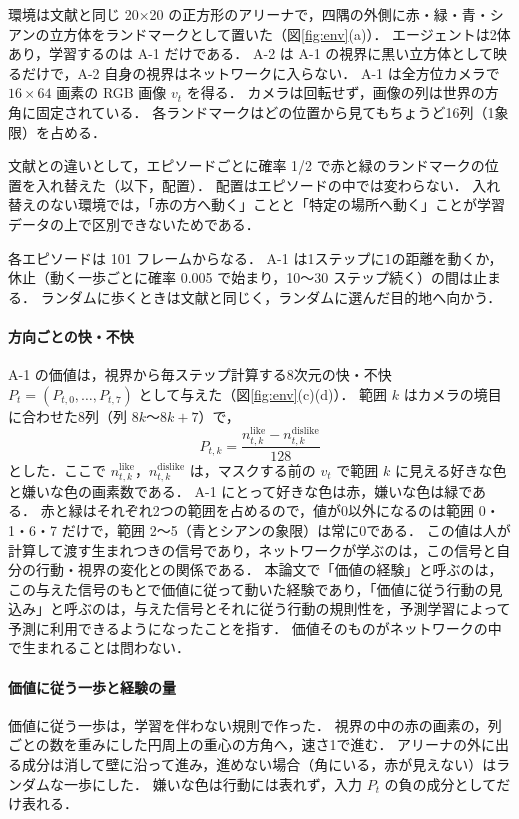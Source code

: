 環境は文献\cite{noguchi2022superposition}と同じ 20×20 の正方形のアリーナで，四隅の外側に赤・緑・青・シアンの立方体をランドマークとして置いた（図\ref{fig:env}(a)）．
エージェントは2体あり，学習するのは A-1 だけである．
A-2 は A-1 の視界に黒い立方体として映るだけで，A-2 自身の視界はネットワークに入らない．
A-1 は全方位カメラで $16\times64$ 画素の RGB 画像 $v_t$ を得る．
カメラは回転せず，画像の列は世界の方角に固定されている．
各ランドマークはどの位置から見てもちょうど16列（1象限）を占める．

文献\cite{noguchi2022superposition}との違いとして，エピソードごとに確率 1/2 で赤と緑のランドマークの位置を入れ替えた（以下，配置）．
配置はエピソードの中では変わらない．
入れ替えのない環境では，「赤の方へ動く」ことと「特定の場所へ動く」ことが学習データの上で区別できないためである．

各エピソードは 101 フレームからなる．
A-1 は1ステップに1の距離を動くか，休止（動く一歩ごとに確率 0.005 で始まり，10〜30 ステップ続く）の間は止まる．
ランダムに歩くときは文献\cite{noguchi2022superposition}と同じく，ランダムに選んだ目的地へ向かう．

\paragraph{方向ごとの快・不快}
A-1 の価値は，視界から毎ステップ計算する8次元の快・不快 $P_t=(P_{t,0},\dots,P_{t,7})$ として与えた（図\ref{fig:env}(c)(d)）．
範囲 $k$ はカメラの境目に合わせた8列（列 $8k$〜$8k{+}7$）で，
\begin{equation}
  P_{t,k} = \frac{n^{\mathrm{like}}_{t,k} - n^{\mathrm{dislike}}_{t,k}}{128}
\end{equation}
とした．ここで $n^{\mathrm{like}}_{t,k}$，$n^{\mathrm{dislike}}_{t,k}$ は，マスクする前の $v_t$ で範囲 $k$ に見える好きな色と嫌いな色の画素数である．
A-1 にとって好きな色は赤，嫌いな色は緑である．
赤と緑はそれぞれ2つの範囲を占めるので，値が0以外になるのは範囲 0・1・6・7 だけで，範囲 2〜5（青とシアンの象限）は常に0である．
この値は人が計算して渡す生まれつきの信号であり，ネットワークが学ぶのは，この信号と自分の行動・視界の変化との関係である．
本論文で「価値の経験」と呼ぶのは，この与えた信号のもとで価値に従って動いた経験であり，「価値に従う行動の見込み」と呼ぶのは，与えた信号とそれに従う行動の規則性を，予測学習によって予測に利用できるようになったことを指す．
価値そのものがネットワークの中で生まれることは問わない．

\paragraph{価値に従う一歩と経験の量}
価値に従う一歩は，学習を伴わない規則で作った．
視界の中の赤の画素の，列ごとの数を重みにした円周上の重心の方角へ，速さ1で進む．
アリーナの外に出る成分は消して壁に沿って進み，進めない場合（角にいる，赤が見えない）はランダムな一歩にした．
嫌いな色は行動には表れず，入力 $P_t$ の負の成分としてだけ表れる．

